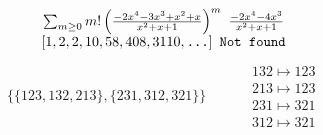 \begin{tiny}
\begin{align}
\begin{matrix}
\end{matrix}
\end{align}
$$
\begin{matrix}
\sum_{m \geq 0} m! \left(
\frac{-2 x^{4} - 3 x^{3} + x^{2} + x}{x^{2} + x + 1}
\right)^m
\ 
\frac{-2 x^{4} - 4 x^{3}}{x^{2} + x + 1}
\\
\left[1, 2, 2, 10, 58, 408, 3110, \text{\texttt{...}}\right]
\ 
\texttt{Not found}
\end{matrix}
$$
\vspace{-1em}
\begin{align}
\{\{123, 132, 213\}, \{231, 312, 321\}\}
\quad
&
\phantom{.}
&
\begin{matrix}
132 \mapsto 123\\213 \mapsto 123\\231 \mapsto 321\\312 \mapsto 321
\end{matrix}
\end{align}
\end{tiny}
